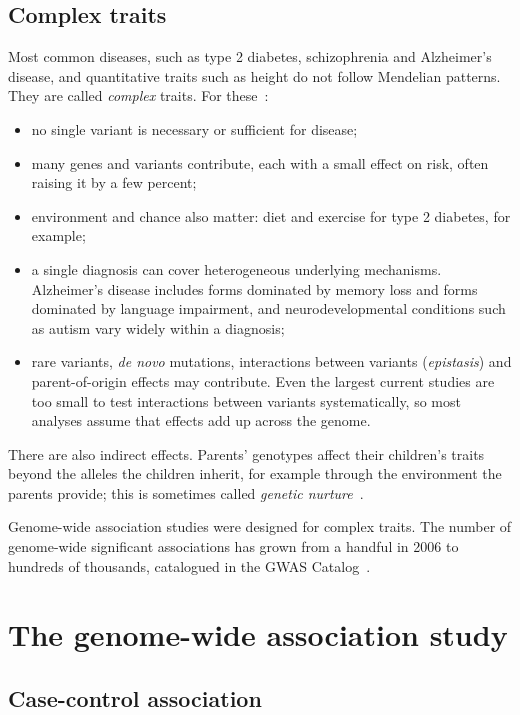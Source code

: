 \subsection{Complex traits}

Most common diseases, such as type 2 diabetes, schizophrenia and Alzheimer's disease, and quantitative traits such as height do not follow Mendelian patterns. They are called \emph{complex} traits. For these~\citep{manolio2009}:
\begin{itemize}
  \item no single variant is necessary or sufficient for disease;
  \item many genes and variants contribute, each with a small effect on risk, often raising it by a few percent;
  \item environment and chance also matter: diet and exercise for type 2 diabetes, for example;
  \item a single diagnosis can cover heterogeneous underlying mechanisms. Alzheimer's disease includes forms dominated by memory loss and forms dominated by language impairment, and neurodevelopmental conditions such as autism vary widely within a diagnosis;
  \item rare variants, \emph{de novo} mutations, interactions between variants (\emph{epistasis}) and parent-of-origin effects may contribute. Even the largest current studies are too small to test interactions between variants systematically, so most analyses assume that effects add up across the genome.
\end{itemize}
There are also indirect effects. Parents' genotypes affect their children's traits beyond the alleles the children inherit, for example through the environment the parents provide; this is sometimes called \emph{genetic nurture}~\citep{kong2018}.

Genome-wide association studies were designed for complex traits. The number of genome-wide significant associations has grown from a handful in 2006 to hundreds of thousands, catalogued in the GWAS Catalog~\citep{buniello2019}.

\section{The genome-wide association study}
\label{sec:gwas_model}

\subsection{Case-control association}


